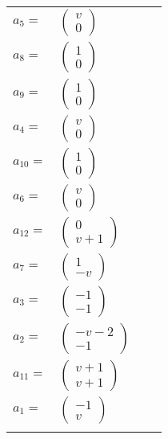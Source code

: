 \documentclass[1p]{elsarticle_modified}
\theoremstyle{definition}
\begin{document}
\begin{tabular}{m{7pt} m{180pt} m{7pt} m{180pt} }
\flushright $a_{5}=$&$\begin{pmatrix}v\\0\end{pmatrix}$ \\
\flushright $a_{8}=$&$\begin{pmatrix}1\\0\end{pmatrix}$ \\
\flushright $a_{9}=$&$\begin{pmatrix}1\\0\end{pmatrix}$ \\
\flushright $a_{4}=$&$\begin{pmatrix}v\\0\end{pmatrix}$ \\
\flushright $a_{10}=$&$\begin{pmatrix}1\\0\end{pmatrix}$ \\
\flushright $a_{6}=$&$\begin{pmatrix}v\\0\end{pmatrix}$ \\
\flushright $a_{12}=$&$\begin{pmatrix}0\\v+1\end{pmatrix}$ \\
\flushright $a_{7}=$&$\begin{pmatrix}1\\- v\end{pmatrix}$ \\
\flushright $a_{3}=$&$\begin{pmatrix}-1\\-1\end{pmatrix}$ \\
\flushright $a_{2}=$&$\begin{pmatrix}- v-2\\-1\end{pmatrix}$ \\
\flushright $a_{11}=$&$\begin{pmatrix}v+1\\v+1\end{pmatrix}$ \\
\flushright $a_{1}=$&$\begin{pmatrix}-1\\v\end{pmatrix}$\\&\end{tabular}
\end{document}

